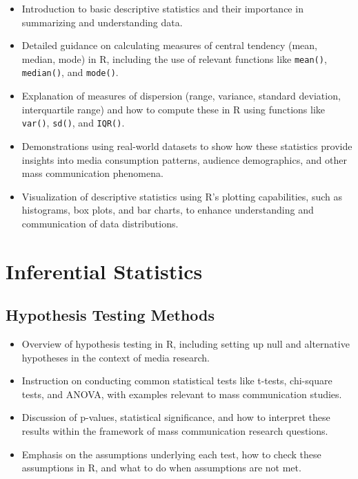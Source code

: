 \documentclass[
]{book}
\begin{document}
\begin{itemize}
\item
  Introduction to basic descriptive statistics and their importance in summarizing and understanding data.
\item
  Detailed guidance on calculating measures of central tendency (mean, median, mode) in R, including the use of relevant functions like \texttt{mean()}, \texttt{median()}, and \texttt{mode()}.
\item
  Explanation of measures of dispersion (range, variance, standard deviation, interquartile range) and how to compute these in R using functions like \texttt{var()}, \texttt{sd()}, and \texttt{IQR()}.
\item
  Demonstrations using real-world datasets to show how these statistics provide insights into media consumption patterns, audience demographics, and other mass communication phenomena.
\item
  Visualization of descriptive statistics using R's plotting capabilities, such as histograms, box plots, and bar charts, to enhance understanding and communication of data distributions.
\end{itemize}

\hypertarget{inferential-statistics}{%
\section*{Inferential Statistics}\label{inferential-statistics}}

\hypertarget{hypothesis-testing-methods}{%
\subsection*{Hypothesis Testing Methods}\label{hypothesis-testing-methods}}

\begin{itemize}
\item
  Overview of hypothesis testing in R, including setting up null and alternative hypotheses in the context of media research.
\item
  Instruction on conducting common statistical tests like t-tests, chi-square tests, and ANOVA, with examples relevant to mass communication studies.
\item
  Discussion of p-values, statistical significance, and how to interpret these results within the framework of mass communication research questions.
\item
  Emphasis on the assumptions underlying each test, how to check these assumptions in R, and what to do when assumptions are not met.
\end{itemize}
\end{document}
